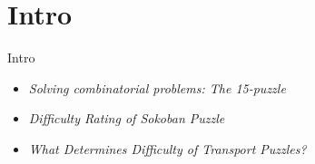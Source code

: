 \documentclass[xcolor={table}]{beamer}
\title{}
\author{Bc. Vladimír Macko}
\institute{RNDr. Radim Řehůřek, Ph.D}
\begin{document}
        
    \begin{frame}
        \titlepage
    \end{frame}
    
    \section{Intro}
        \begin{frame}{Intro}
            \begin{block}{}
                \begin{itemize}
                    \item \emph{Solving combinatorial problems: The 15-puzzle} \cite{Pizlo2005}
                    \item \emph{Difficulty Rating of Sokoban Puzzle} \cite{Jarusek2010}
                    \item \emph{What Determines Difficulty of Transport Puzzles?} \cite{transport}
                \end{itemize}
            \end{block}
        \end{frame} 
\end{document}

